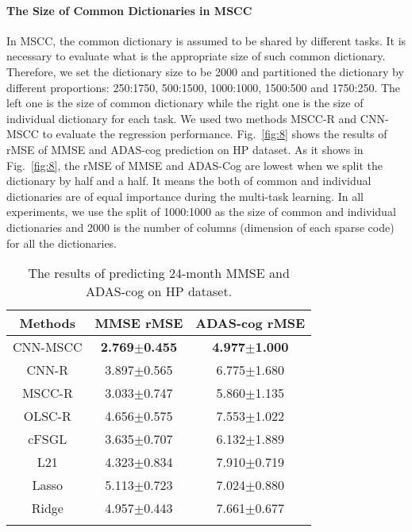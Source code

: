 \documentclass[10pt,twocolumn,letterpaper]{article}
\begin{document}
\paragraph{The Size of Common Dictionaries in MSCC} 
In MSCC, the common dictionary is assumed to be shared by different tasks. It is necessary to evaluate what is the appropriate size of such common dictionary. Therefore, we set the dictionary size to be 2000 and partitioned the dictionary by different proportions: 250:1750, 500:1500, 1000:1000, 1500:500 and 1750:250. The left one is the size of common dictionary while the right one is the size of individual dictionary for each task. We used two methods MSCC-R and CNN-MSCC to evaluate the regression performance. Fig.~\ref{fig:8} shows the results of rMSE of MMSE and ADAS-cog prediction on HP dataset. As it shows in Fig.~\ref{fig:8}, the rMSE of MMSE and ADAS-Cog are lowest when we split the dictionary by half and a half. It means the both of common and individual dictionaries are of equal importance during the multi-task learning. In all experiments, we use the split of 1000:1000 as the size of common and individual dictionaries and 2000 is the number of columns (dimension of each sparse code) for all the dictionaries.

\begin{table}[b]
\centering
\caption{The results of predicting 24-month MMSE and ADAS-cog on HP dataset.}
\label{tab:1}
\vspace{-0.7em}
\begin{tabular}{ccc}
\toprule
Methods& MMSE rMSE&ADAS-cog rMSE\\\hline
CNN-MSCC &\textbf{2.769$\pm$0.455}& \textbf{4.977$\pm$1.000}\\
CNN-R &3.897$\pm$0.565&6.775$\pm$1.680\\
MSCC-R&3.033$\pm$0.747&5.860$\pm$1.135\\
OLSC-R&4.656$\pm$0.575&7.553$\pm$1.022\\
cFSGL&3.635$\pm$0.707&6.132$\pm$1.889\\
L21&4.323$\pm$0.834&7.910$\pm$0.719\\
Lasso&5.113$\pm$0.723&7.024$\pm$0.880\\
Ridge&4.957$\pm$0.443&7.661$\pm$0.677\\
\bottomrule
\vspace{-2em}
\end{tabular}
\end{table}
\end{document}
